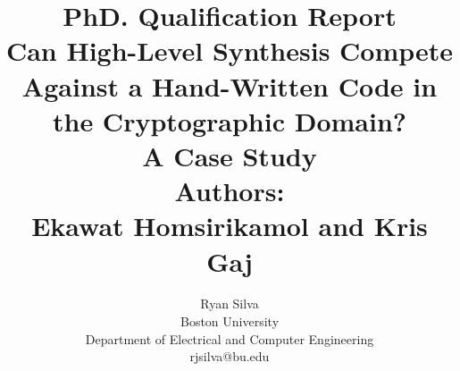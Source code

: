 \documentclass[11pt,journal,compsoc, onecolumn]{IEEEtran}
\begin{document}
\title{PhD. Qualification Report \\ \LARGE{\textbf{Can High-Level Synthesis Compete Against a Hand-Written Code in the Cryptographic Domain? \\ A Case Study \cite{sel}}} \\ Authors: \\ Ekawat Homsirikamol and Kris Gaj}

\author{Ryan Silva \\ Boston University \\ Department of Electrical and Computer Engineering \\ rjsilva@bu.edu
}


\maketitle


\IEEEdisplaynontitleabstractindextext
\IEEEpeerreviewmaketitle
\end{document}
